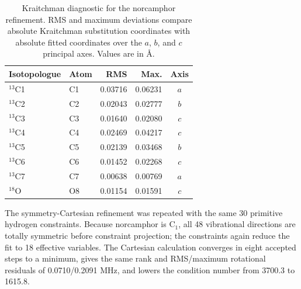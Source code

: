\documentclass[journal=jctcce,manuscript=article,maxauthors=999]{achemso}
\begin{document}
\begin{table}
\caption{Kraitchman diagnostic for the norcamphor refinement. RMS and maximum deviations compare absolute Kraitchman substitution coordinates with absolute fitted coordinates over the $a$, $b$, and $c$ principal axes. Values are in \AA.}
\label{tab:norcamphor-kraitchman}
\begin{tabular}{llrrc}
\toprule
Isotopologue & Atom & RMS & Max. & Axis \\
\midrule
$^{13}$C1 & C1 & 0.03716 & 0.06231 & $a$ \\
$^{13}$C2 & C2 & 0.02043 & 0.02777 & $b$ \\
$^{13}$C3 & C3 & 0.01640 & 0.02080 & $c$ \\
$^{13}$C4 & C4 & 0.02469 & 0.04217 & $c$ \\
$^{13}$C5 & C5 & 0.02139 & 0.03468 & $b$ \\
$^{13}$C6 & C6 & 0.01452 & 0.02268 & $c$ \\
$^{13}$C7 & C7 & 0.00638 & 0.00769 & $a$ \\
$^{18}$O & O8 & 0.01154 & 0.01591 & $c$ \\
\bottomrule
\end{tabular}
\end{table}

The symmetry-Cartesian refinement was repeated with the same 30 primitive
hydrogen constraints. Because norcamphor is C$_1$, all 48 vibrational
directions are totally symmetric before constraint projection; the constraints
again reduce the fit to 18 effective variables. The Cartesian calculation
converges in eight accepted steps to a minimum, gives the same rank and
RMS/maximum rotational residuals of 0.0710/0.2091 MHz, and lowers the condition
number from 3700.3 to 1615.8.
\end{document}
